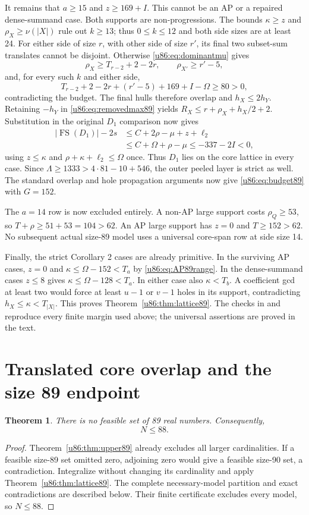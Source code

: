 \documentclass[11pt,a4paper]{article}
\newtheorem{theorem}{Theorem}[section]
\theoremstyle{remark}
\newcommand{\FS}{\operatorname{FS}}
\begin{document}
It remains that $a\ge15$ and $z\ge169+I$. This cannot be an AP or a
repaired dense-summand case. Both supports are non-progressions.
The bounds $\kappa\ge z$ and $\rho_X\ge\nu(|X|)$ rule out $k\ge13$;
thus $0\le k\le12$ and both side sizes are at least 24.
For either side of size $r$, with other side of size $r'$, its final two
subset-sum translates cannot be disjoint. Otherwise
\eqref{u86:eq:dominantmu} gives
\[
 \rho_X\ge T_{r-2}+2-2r,\qquad \rho_{X'}\ge r'-5,
\]
and, for every such $k$ and either side,
\[
 T_{r-2}+2-2r+(r'-5)+169+I-\Omega\ge80>0,
\]
contradicting the budget. The final hulls therefore overlap and
$h_X\le2h_Y$. Retaining $-h_Y$ in \eqref{u86:eq:removedmax89} yields
$R_X\le r+\rho_X+h_X/2+2$.
Substitution in the original $D_1$ comparison now gives
\begin{align*}
 |\FS(D_1)|-2s
 &\le C+2\rho-\mu+z+\ell_2\\
 &\le C+\Omega+\rho-\mu\le-337-2I<0,
\end{align*}
using $z\le\kappa$ and $\rho+\kappa+\ell_2\le\Omega$ once.
Thus $D_1$ lies on the core lattice in every case.
Since $\Lambda\ge1333>4\cdot81-10+546$, the outer peeled layer is
strict as well. The standard overlap and hole propagation arguments
now give \eqref{u86:eq:budget89} with $G=152$.

The $a=14$ row is now excluded entirely. A non-AP large support costs
$\rho_Q\ge53$, so $T+\rho\ge51+53=104>62$.
An AP large support has $z=0$ and $T\ge152>62$.
No subsequent actual size-89 model uses a universal core-span row at
side size 14.

Finally, the strict Corollary 2 cases are already primitive. In the
surviving AP cases, $z=0$ and $\kappa\le\Omega-152<T_a$ by
\eqref{u86:eq:AP89range}. In the dense-summand cases $z\le8$ gives
$\kappa\le\Omega-128<T_a$. In either case also $\kappa<T_b$.
A coefficient gcd at least two would force at least $u-1$ or $v-1$
holes in its support, contradicting $h_X\le\kappa<T_{|X|}$.
This proves Theorem~\ref{u86:thm:lattice89}. The checks in
 and  reproduce every
finite margin used above; the universal assertions are proved in the text.

\section{Translated core overlap and the size 89 endpoint}\label{u86:sec:upper88}
\begin{theorem}\label{u86:thm:upper88}
There is no feasible set of 89 real numbers. Consequently,
\[
 \boxed{N\le88.}
\]
\end{theorem}
\begin{proof}
Theorem~\ref{u86:thm:upper89} already excludes all larger cardinalities.
If a feasible size-89 set omitted zero, adjoining zero would give a
feasible size-90 set, a contradiction. Integralize without changing its
cardinality and apply Theorem~\ref{u86:thm:lattice89}.
The complete necessary-model partition and exact contradictions are
described below. Their finite certificate excludes every
model, so $N\le88$.

\end{proof}
\end{document}
